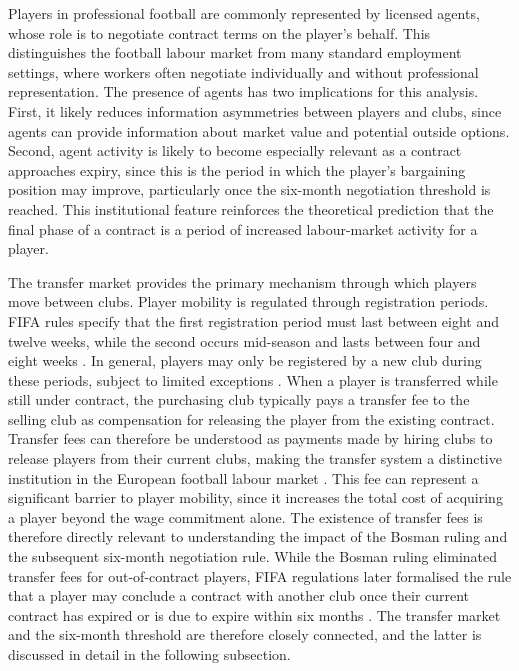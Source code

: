 \documentclass{article}
\begin{document}
Players in professional football are commonly represented by licensed agents, whose role is to negotiate contract terms on the player's behalf. This distinguishes the football labour market from many standard employment settings, where workers often negotiate individually and without professional representation. The presence of agents has two implications for this analysis. First, it likely reduces information asymmetries between players and clubs, since agents can provide information about market value and potential outside options. Second, agent activity is likely to become especially relevant as a contract approaches expiry, since this is the period in which the player’s bargaining position may improve, particularly once the six-month negotiation threshold is reached. This institutional feature reinforces the theoretical prediction that the final phase of a contract is a period of increased labour-market activity for a player. \

The transfer market provides the primary mechanism through which players move between clubs. Player mobility is regulated through registration periods. FIFA rules specify that the first registration period must last between eight and twelve weeks, while the second occurs mid-season and lasts between four and eight weeks \citep{fifa_rstp_2025}. In general, players may only be registered by a new club during these periods, subject to limited exceptions \citep{fifa_rstp_2025}. When a player is transferred while still under contract, the purchasing club typically pays a transfer fee to the selling club as compensation for releasing the player from the existing contract. Transfer fees can therefore be understood as payments made by hiring clubs to release players from their current clubs, making the transfer system a distinctive institution in the European football labour market \citep{hoey_peeters_principe_2021}. This fee can represent a significant barrier to player mobility, since it increases the total cost of acquiring a player beyond the wage commitment alone. The existence of transfer fees is therefore directly relevant to understanding the impact of the Bosman ruling and the subsequent six-month negotiation rule. While the Bosman ruling eliminated transfer fees for out-of-contract players, FIFA regulations later formalised the rule that a player may conclude a contract with another club once their current contract has expired or is due to expire within six months \citep{fifa_rstp_2025}. The transfer market and the six-month threshold are therefore closely connected, and the latter is discussed in detail in the following subsection. \
\end{document}
